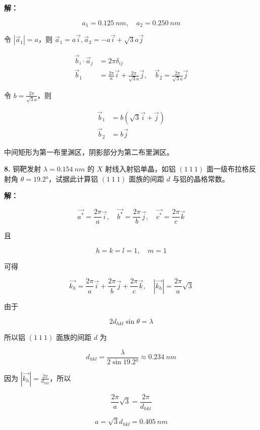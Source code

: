 \noindent \textbf{解：}

\begin{equation*}
    a_1=\qty{0.125}{nm}, \quad a_2=\qty{0.250}{nm}
\end{equation*}

令 $|\vec{a}_1|=a$，则 $\vec{a}_1=a\vec{i}, \vec{a}_2=-a\vec{i}+\sqrt{3}a\vec{j}$

\begin{align*}
    \vec{b}_i \cdot \vec{a}_j &= 2\pi \delta_{ij} \\
    \vec{b}_1 &= \frac{2\pi}{a} \vec{i} + \frac{2\pi}{\sqrt{3}a} \vec{j}, \quad \vec{b}_2 = \frac{2\pi}{\sqrt{3}a} \vec{j}
\end{align*}

令 $b=\frac{2\pi}{\sqrt{3}a}$，则

\begin{align*}
    \vec{b}_1 &= b(\sqrt{3}\vec{i}+\vec{j}) \\
    \vec{b}_2 &= b \vec{j}
\end{align*}

中间矩形为第一布里渊区，阴影部分为第二布里渊区。

\noindent \textbf{8.\quad} 铜靶发射 $\lambda=\qty{0.154}{nm}$ 的 $X$ 射线入射铝单晶，如铝 $(1\ 1\ 1)$ 面一级布拉格反射角 $\theta=\ang{19.2}$，试据此计算铝 $(1\ 1\ 1)$ 面族的间距 $d$ 与铝的晶格常数。

\noindent \textbf{解：}

\begin{equation*}
    \vec{a^*} = \frac{2\pi}{a} \vec{i}, \quad \vec{b^*} = \frac{2\pi}{b} \vec{j}, \quad \vec{c^*} = \frac{2\pi}{c} \vec{k}
\end{equation*}

且

\begin{equation*}
    h = k = l = 1, \quad m = 1
\end{equation*}

可得

\begin{equation*}
    \vec{k_h} = \frac{2\pi}{a} \vec{i} + \frac{2\pi}{b} \vec{j} + \frac{2\pi}{c} \vec{k}, \quad |\vec{k_h}| = \frac{2\pi}{a} \sqrt{3}
\end{equation*}

由于

\begin{equation*}
    2 d_{hkl} \sin\theta = \lambda
\end{equation*}

所以铝 $(1\ 1\ 1)$ 面族的间距 $d$ 为

\begin{equation*}
    d_{hkl} =  \frac{\lambda}{2\sin \ang{19.2}} \approx \qty{0.234}{nm}
\end{equation*}

因为 $|\vec{k_h}|=\frac{2\pi}{d_{hkl}}$，所以

\begin{equation*}
    \frac{2\pi}{a} \sqrt{3} = \frac{2\pi}{d_{hkl}}
\end{equation*}

\begin{equation*}
    a = \sqrt{3} d_{hkl} = \qty{0.405}{nm}
\end{equation*}
